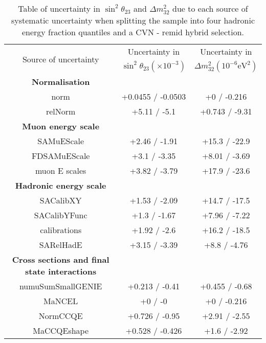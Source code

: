 \begin{table*}[t]
  \centering
  \caption{
    Table of uncertainty in $\sin^2\!\theta_{23}$ and $\Delta
    m^2_{32}$ due to each source of systematic uncertainty when
    splitting the sample into four hadronic energy fraction quantiles
    and a CVN -  remid hybrid selection.
  }
  \begin{tabular}{c c c}
    \hline 
    \multirow{2}{*}{Source of uncertainty} & 
                                             Uncertainty in & 
                                                              Uncertainty in \\
                                           & $\sin^2\!\theta_{23}
                                             (\times 10^{-3})$ & 
                                                                 $\Delta
                                                                 m^2_{32}
                                                                 \left(10^{-6}\text{
                                                                 eV}^{2}\right)$\\
    \hline 
    \textbf{Normalisation} & & \\
    norm & +0.0455 / -0.0503 & +0 / -0.216\\
    relNorm & +5.11 / -5.1 & +0.743 / -9.31\\
    \textbf{Muon energy scale} & & \\
    SAMuEScale & +2.46 / -1.91 & +15.3 / -22.9\\
    FDSAMuEScale & +3.1 / -3.35 & +8.01 / -3.69\\
    muon E scales & +3.82 / -3.79 & +17.9 / -23.6\\
    \textbf{Hadronic energy scale} & & \\
    SACalibXY & +1.53 / -2.09 & +14.7 / -17.5\\
    SACalibYFunc & +1.3 / -1.67 & +7.96 / -7.22\\
    calibrations & +1.92 / -2.6 & +16.2 / -18.5\\    
    SARelHadE & +3.15 / -3.39 & +8.8 / -4.76\\
    \textbf{Cross sections and final state interactions} & & \\
    numuSumSmallGENIE & +0.213 / -0.41 & +0.455 / -0.68\\
    MaNCEL & +0 / -0 & +0 / -0.216\\
    NormCCQE & +0.726 / -0.95 & +2.91 / -2.55\\
    MaCCQEshape & +0.528 / -0.426 & +1.6 / -2.92\\

\end{tabular}
\end{table*}
